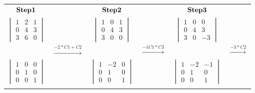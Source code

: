 \documentclass[]{article}
\begin{document}
\begingroup

\begin{tabular}{ c c c c c c }
$\bold{Step 1}$ &  & $\bold{Step 2}$  &  & $\bold{Step 3}$ \\
$\begin{vmatrix} 1 & 2 & 1\\ 0 & 4 & 3 \\ 3 & 6 & 0 \end{vmatrix}$ &  & $\begin{vmatrix} 1 & 0 & 1\\ 0 & 4 & 3 \\ 3 & 0 & 0 \end{vmatrix}$ &  & $\begin{vmatrix} 1 & 0 & 0\\ 0 & 4 & 3 \\ 3 & 0 & -3 \end{vmatrix}$ \\  
 & $\xrightarrow{-2*C1 + C2}$ &  & $\xrightarrow{-1C1*C3}$ & & $\xrightarrow{-3*C2}$\\
$\begin{vmatrix} 1 &   0 &   0\\ 0 &   1 &   0 \\ 0 &   0 &   1 \end{vmatrix}$ &  & $\begin{vmatrix} 1 &   -2 &   0\\ 0 &   1 &   0 \\ 0 &   0 &   1 \end{vmatrix}$ &  & $\begin{vmatrix} 1 &   -2 &   -1\\ 0 &   1 &   0 \\ 0 &   0 &   1 \end{vmatrix}$\\
 &  &  \\
\end{tabular}

\endgroup

\hspace{3cm}

\begingroup
\end{document}
